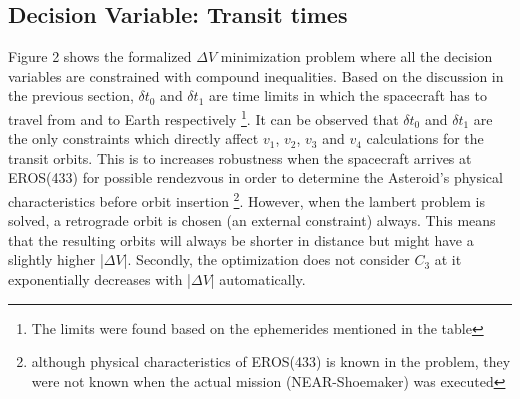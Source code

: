 \documentclass[11pt,a4paper]{article}
\begin{document}
\begin{multicols}{2}
\subsection{Decision Variable: Transit times}
Figure 2 shows the formalized $\Delta V$ minimization problem where all the decision variables are constrained with compound inequalities. Based on the discussion in the previous section, $\delta t_0$ and $\delta t_1$ are time limits in which the spacecraft has to travel from and to Earth respectively \footnote{The limits were found based on the ephemerides mentioned in the table}. It can be observed that $\delta t_0$ and $\delta t_1$ are the only constraints which directly affect $v_1$, $v_2$, $v_3$ and $v_4$ calculations for the transit orbits. This is to increases robustness when the spacecraft arrives at EROS(433)  for possible rendezvous in order to determine the Asteroid's physical characteristics before orbit insertion \footnote{although physical characteristics of EROS(433) is known in the problem, they were not known when the actual mission (NEAR-Shoemaker) was executed}. However, when the lambert problem is solved, a retrograde orbit is chosen (an external constraint)  always. This means that the resulting orbits will always be shorter in distance but might have a slightly higher |$\Delta V$|. Secondly, the optimization does not consider $C_3$ at it exponentially decreases with |$\Delta V$| automatically.


\end{multicols}
\end{document}
